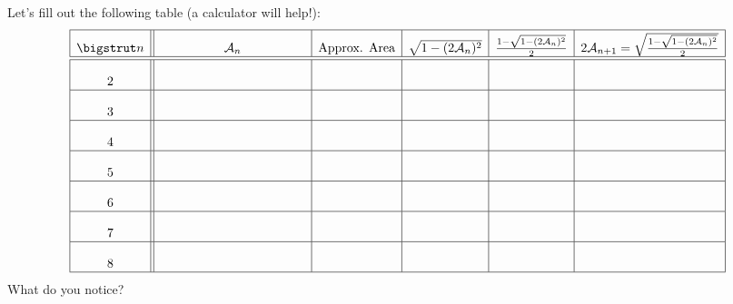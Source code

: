 \begin{prob} 
Let's fill out the following table (a calculator will help!):
\[
\begin{array}{| c || c | c | c | c | c |}
\hline\bigstrut
n  & \mathcal{A}_n & \text{Approx. Area} & \sqrt{1-(2\mathcal{A}_n)^2} & \frac{1 - \sqrt{1-(2\mathcal{A}_n)^2} }{2} &\rule[0mm]{0mm}{6mm}2\mathcal{A}_{n+1} =\sqrt{\frac{1 - \sqrt{1-(2\mathcal{A}_n)^2} }{2}} \\ \hline\hline 
2 &\rule[7mm]{20mm}{0mm}\hspace{20mm}  &\hspace{20mm}  &\hspace{20mm}  & \hspace{20mm} & \hspace{20mm}\\ \hline
3 &\rule[0mm]{0mm}{7mm}   &  &  & &   \\ \hline
4 &\rule[0mm]{0mm}{7mm}   &  &  & &   \\ \hline
5 &\rule[0mm]{0mm}{7mm}   &  &  & &   \\ \hline
6 &\rule[0mm]{0mm}{7mm}   &  &  & &   \\ \hline
7 &\rule[0mm]{0mm}{7mm}   &  &  & &   \\ \hline
8 &\rule[0mm]{0mm}{7mm}   &  &  & &   \\ \hline
\end{array}
\]
What do you notice?
\end{prob}
